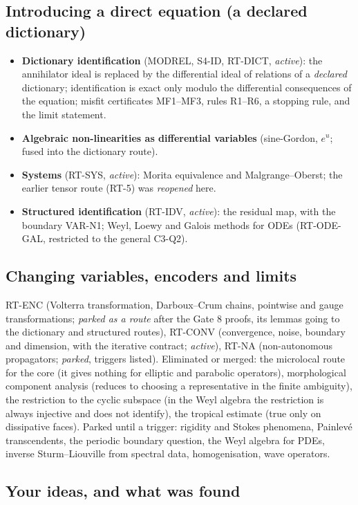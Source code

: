 \documentclass[11pt]{article}
\theoremstyle{plain}
\theoremstyle{definition}
\theoremstyle{remark}
\begin{document}
\subsection{Introducing a direct equation (a declared dictionary)}
\begin{itemize}
\item \textbf{Dictionary identification} (MODREL, S4-ID, RT-DICT, \emph{active}): the annihilator ideal is replaced by the differential ideal of relations of a \emph{declared} dictionary; identification is exact only modulo the differential consequences of the equation; misfit certificates MF1--MF3, rules R1--R6, a stopping rule, and the limit statement.
\item \textbf{Algebraic non-linearities as differential variables} (sine-Gordon, $e^u$; fused into the dictionary route).
\item \textbf{Systems} (RT-SYS, \emph{active}): Morita equivalence and Malgrange--Oberst; the earlier tensor route (RT-5) was \emph{reopened} here.
\item \textbf{Structured identification} (RT-IDV, \emph{active}): the residual map, with the boundary VAR-N1; Weyl, Loewy and Galois methods for ODEs (RT-ODE-GAL, restricted to the general C3-Q2).
\end{itemize}

\subsection{Changing variables, encoders and limits}
RT-ENC (Volterra transformation, Darboux--Crum chains, pointwise and gauge transformations; \emph{parked as a route} after the Gate 8 proofs, its lemmas going to the dictionary and structured routes), RT-CONV (convergence, noise, boundary and dimension, with the iterative contract; \emph{active}), RT-NA (non-autonomous propagators; \emph{parked}, triggers listed).
Eliminated or merged: the microlocal route for the core (it gives nothing for elliptic and parabolic operators), morphological component analysis (reduces to choosing a representative in the finite ambiguity), the restriction to the cyclic subspace (in the Weyl algebra the restriction is always injective and does not identify), the tropical estimate (true only on dissipative faces).
Parked until a trigger: rigidity and Stokes phenomena, Painlev\'e transcendents, the periodic boundary question, the Weyl algebra for PDEs, inverse Sturm--Liouville from spectral data, homogenisation, wave operators.

\subsection{Your ideas, and what was found}
\end{document}
